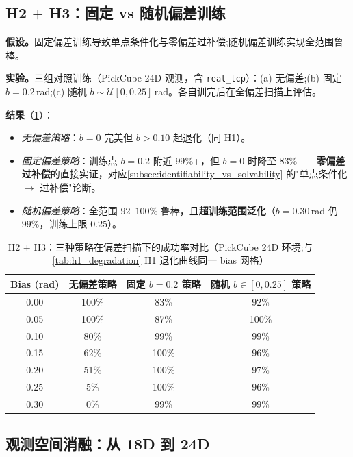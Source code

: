 \subsection{H2 $+$ H3：固定 vs 随机偏差训练}\label{sec:exp_h2}

\textbf{假设。}固定偏差训练导致单点条件化与零偏差过补偿;随机偏差训练实现全范围鲁棒。

\textbf{实验。}三组对照训练（PickCube 24D 观测，含 \texttt{real\_tcp}）：(a) 无偏差;(b) 固定 $b = 0.2$\,rad;(c) 随机 $b \sim \mathcal{U}[0, 0.25]$\,rad。各自训完后在全偏差扫描上评估。

\textbf{结果}（\cref{tab:h2h3_three_strategies}）：
\begin{itemize}
  \item \emph{无偏差策略}：$b = 0$ 完美但 $b > 0.10$ 起退化（同 H1）。
  \item \emph{固定偏差策略}：训练点 $b = 0.2$ 附近 $99\%$+，但 $b = 0$ 时降至 $83\%$——\textbf{零偏差过补偿}的直接实证，对应\cref{subsec:identifiability_vs_solvability} 的"单点条件化 $\to$ 过补偿"论断。
  \item \emph{随机偏差策略}：全范围 $92$–$100\%$ 鲁棒，且\textbf{超训练范围泛化}（$b = 0.30$\,rad 仍 $99\%$，训练上限 $0.25$）。
\end{itemize}

\begin{table}[htbp]
  \centering
  \caption{H2 $+$ H3：三种策略在偏差扫描下的成功率对比（PickCube 24D 环境;与\cref{tab:h1_degradation} H1 退化曲线同一 bias 网格）}
  \label{tab:h2h3_three_strategies}
  \footnotesize
  \begin{tabular}{@{}cccc@{}}
    \toprule
    Bias (rad) & 无偏差策略 & 固定 $b=0.2$ 策略 & 随机 $b\in[0,0.25]$ 策略 \\
    \midrule
    0.00 & 100\% & 83\%   & 92\% \\
    0.05 & 100\% & 87\%   & 100\% \\
    0.10 & 80\%  & 99\%   & 99\% \\
    0.15 & 62\%  & 100\%  & 96\% \\
    0.20 & 51\%  & 100\%  & 97\% \\
    0.25 & 5\%   & 100\%  & 96\% \\
    0.30 & 0\%   & 99\%   & 99\% \\
    \bottomrule
  \end{tabular}
\end{table}

\subsection{观测空间消融：从 18D 到 24D}\label{sec:exp_ablation}

